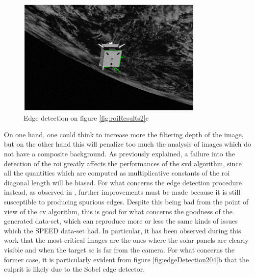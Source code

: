 \begin{figure}[htbp]
  \centering
  \includegraphics[width=0.82\textwidth]{gfx/results/prisma/164/15.png}
  \caption{Edge detection on figure \ref{fig:roiResults2}e}
  \label{fig:edgeDetection164}
\end{figure}

On one hand, one could think to increase more the filtering depth of the image, but on the other hand this will penalize too much the analysis of images which do not have a composite background.
As previously explained, a failure into the detection of the \acrshort{roi} greatly affects the performances of the \acrshort{svd} algorithm, since all the quantities which are computed as multiplicative constants of the \acrshort{roi} diagonal length will be biased.
For what concerns the edge detection procedure instead, as observed in \cite{Sharma2018}, further improvements must be made because it is still susceptible to producing spurious edges. Despite this being bad from the point of view of the \acrshort{cv} algorithm, this is good for what concerns the goodness of the generated data-set, which can reproduce more or less the same kinds of issues which the SPEED data-set had. In particular, it has been observed during this work that the most critical images are the ones where the solar panels are clearly visible and when the target \acrshort{sc} is far from the camera.
For what concerns the former case, it is particularly evident from figure \ref{fig:edgeDetection204}b that the culprit is likely due to the Sobel edge detector.

